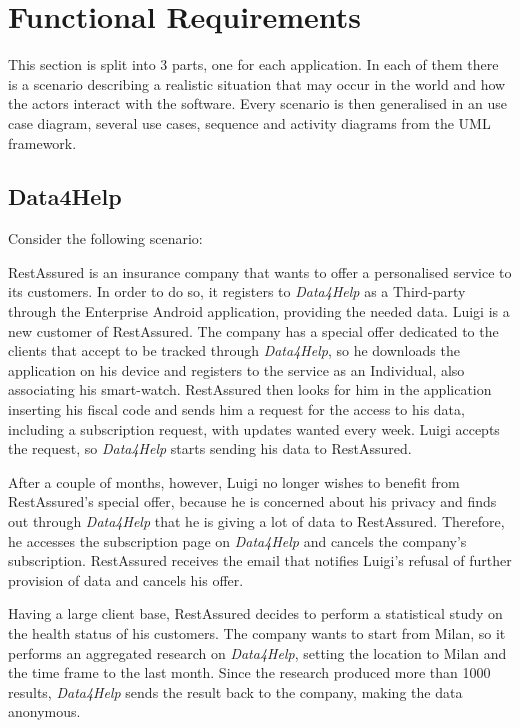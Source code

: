 \section{Functional Requirements}
    This section is split into 3 parts, one for each application. In each of them there is a scenario describing a realistic situation that may occur in the world and how the actors interact with the software. Every scenario is then generalised in an use case diagram, several use cases,  sequence and activity diagrams from the UML framework.
    \subsection{Data4Help}
        Consider the following scenario:
        
        RestAssured is an insurance company that wants to offer a personalised service to its customers. In order to do so, it registers to \emph{Data4Help} as a Third-party through the Enterprise Android application, providing the needed data. Luigi is a new customer of RestAssured. The company has a special offer dedicated to the clients that accept to be tracked through \emph{Data4Help}, so he downloads the application on his device and registers to the service as an Individual, also associating his smart-watch. RestAssured then looks for him in the application inserting his fiscal code and sends him a request for the access to his data, including a subscription request, with updates wanted every week. Luigi accepts the request, so \emph{Data4Help} starts sending his data to RestAssured.
        
        After a couple of months, however, Luigi no longer wishes to benefit from RestAssured's special offer, because he is concerned about his privacy and finds out through \emph{Data4Help} that he is giving a lot of data to RestAssured. Therefore, he accesses the subscription page on \emph{Data4Help} and cancels the company's subscription. RestAssured receives the email that notifies Luigi's refusal of further provision of data and cancels his offer.
        
        Having a large client base, RestAssured decides to perform a statistical study on the health status of his customers. The company wants to start from Milan, so it performs an aggregated research on \emph{Data4Help}, setting the location to Milan and the time frame to the last month. Since the research produced more than 1000 results, \emph{Data4Help} sends the result back to the company, making the data anonymous.
        
